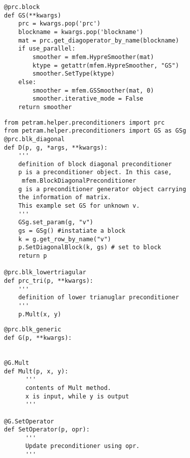 \documentclass[11pt,a4paper,draft]{report}
\begin{document}
\begin{minipage}[c]{0.95\textwidth}
\begin{lstlisting}[caption={A user defined preconditioner block},captionpos=b, frame=single, label={prc1}]
@prc.block
def GS(**kwargs)
    prc = kwargs.pop('prc')
    blockname = kwargs.pop('blockname')
    mat = prc.get_diagoperator_by_name(blockname)
    if use_parallel:
        smoother = mfem.HypreSmoother(mat)
        ktype = getattr(mfem.HypreSmoother, "GS")
        smoother.SetType(ktype)
    else:
        smoother = mfem.GSSmoother(mat, 0)
        smoother.iterative_mode = False
    return smoother
\end{lstlisting}
\end{minipage}

\begin{minipage}[c]{0.95\textwidth}
\begin{lstlisting}[frame=single, caption={A user defined diag/lowertriangular preconditioner},captionpos=b, label={prc2}]
from petram.helper.preconditioners import prc
from petram.helper.preconditioners import GS as GSg
@prc.blk_diagonal
def D(p, g, *args, **kwargs):
    '''
    definition of block diagonal preconditioner
    p is a preconditioner object. In this case,
     mfem.BlockDiagonalPreconditioner
    g is a preconditioner generator object carrying 
    the information of matrix.
    This example set GS for unknown v.  
    '''
    GSg.set_param(g, "v")
    gs = GSg() #instatiate a block
    k = g.get_row_by_name("v")
    p.SetDiagonalBlock(k, gs) # set to block
    return p
    
@prc.blk_lowertriagular
def prc_tri(p, **kwargs):
    '''
    definition of lower trianuglar preconditioner
    '''
    p.Mult(x, y)
\end{lstlisting}
\end{minipage}

\begin{minipage}[c]{0.95\textwidth}
\begin{lstlisting}[caption={A user defined generic preconditioner},captionpos=b, frame=single, label={prc3}]
@prc.blk_generic
def G(p, **kwargs):


@G.Mult
def Mult(p, x, y):
      '''
      contents of Mult method. 
      x is input, while y is output
      '''

@G.SetOperator
def SetOperator(p, opr):
      '''
      Update preconditioner using opr.
      '''
\end{lstlisting}
 \end{minipage}
\end{document}
